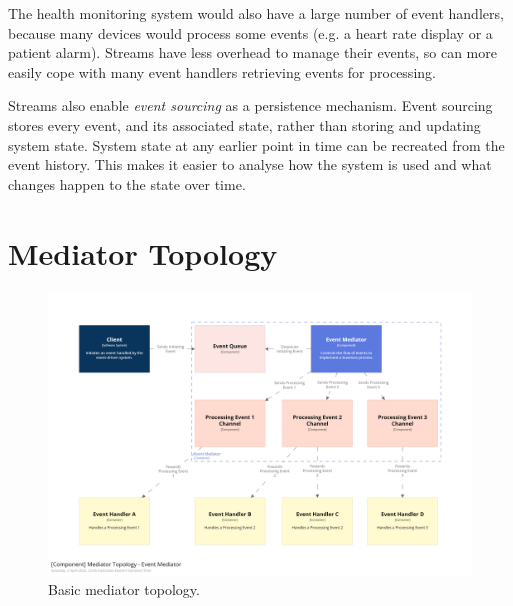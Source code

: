 The health monitoring system would also have a large number of event handlers, because many devices would process some events
(e.g. a heart rate display or a patient alarm).
Streams have less overhead to manage their events, so can more easily cope with many event handlers retrieving events for processing. 

Streams also enable \emph{event sourcing} as a persistence mechanism.
Event sourcing stores every event, and its associated state, rather than storing and updating system state.
System state at any earlier point in time can be recreated from the event history.
This makes it easier to analyse how the system is used and what changes happen to the state over time.

%
%


\section{Mediator Topology}

\begin{figure}[h!]
    \begin{adjustwidth}{-10mm}{-10mm}
        \centering
        \includegraphics[trim=195 195 195 195,clip,width=0.97\paperwidth]{diagrams/mediator-components.png}
    \end{adjustwidth}
    \caption{Basic mediator topology.}
    \label{fig:mediator-components}
\end{figure}

